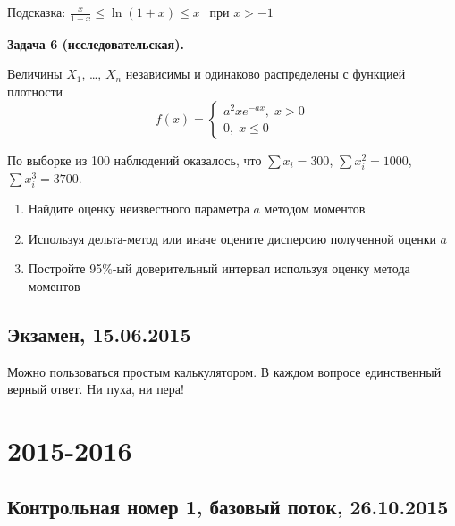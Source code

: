 \documentclass[12pt, a4paper]{article}\usepackage[]{graphicx}\usepackage[]{color}
\begin{document}
\vspace{0.5cm}

Подсказка: $
\frac{x}{1+x} \leq \ln(1+x) \leq x\, \; \text{ при } x>-1
$

\vspace{0.5cm}

\textbf{Задача 6 (исследовательская).}
\thispagestyle{empty}
\vspace{0.1cm}

Величины $X_1$, \ldots, $X_n$ независимы и одинаково распределены с функцией плотности
\[
f(x)=\begin{cases}
a^2xe^{-ax}, \; x>0 \\
0, \; x\leq 0
\end{cases}
\]

По выборке из 100 наблюдений оказалось, что $\sum x_i =300$, $\sum x_i^2=1000$, $\sum x_i^3=3700$.

\begin{enumerate}
\item Найдите оценку неизвестного параметра $a$ методом моментов
\item Используя дельта-метод или иначе оцените дисперсию полученной оценки $a$
\item Постройте 95\%-ый доверительный интервал используя оценку метода моментов
\end{enumerate}


\subsection{Экзамен, 15.06.2015}



\vspace{3ex}

Можно пользоваться простым калькулятором.  В каждом вопросе единственный верный ответ. Ни пуха, ни пера!

\vspace{3ex}



\section{2015-2016}


\subsection{Контрольная номер 1, базовый поток, 26.10.2015}
\end{document}
